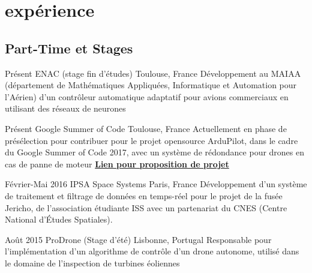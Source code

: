 \documentclass[a4paper]{friggeri-cv} %
\begin{document}

\section{expérience}


\subsection{Part-Time et Stages}

\begin{entrylist}
\entry
{Présent}
{ENAC (stage fin d'études)}
{Toulouse, France}
{Développement au MAIAA (département de Mathématiques Appliquées, Informatique et Automation pour l'Aérien) d'un contrôleur automatique adaptatif pour avions commerciaux en utilisant des réseaux de neurones}

\entry
{Présent}
{Google Summer of Code}
{Toulouse, France}
{Actuellement en phase de présélection pour contribuer pour le projet opensource ArduPilot, dans le cadre du Google Summer of Code 2017, avec un système de rédondance pour drones en cas de panne de moteur \href{https://docs.google.com/document/d/16HyPdOwpOjrw7oF_kXttN3LBA1qMHv-AwRugvF1ypeQ/edit?usp=sharing}{\textbf{Lien pour proposition de projet}}}


\entry
{Février-Mai 2016}
{IPSA Space Systems}
{Paris, France}
{Développement d'un système de traitement et filtrage de données en temps-réel pour le projet de la fusée Jericho, de l'association étudiante ISS avec un partenariat du CNES (Centre National d'Études Spatiales).}


\entry
{Août 2015}
{ProDrone (Stage d'été)}
{Lisbonne, Portugal}
{Responsable pour l'implémentation d'un algorithme de contrôle d'un drone autonome, utilisé dans le domaine de l'inspection de turbines éoliennes}



\end{entrylist}

\end{document}
